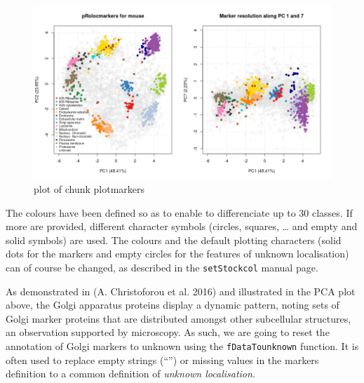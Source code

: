 \begin{Shaded}
\begin{Highlighting}[]
\NormalTok{(} \NormalTok{(}\NormalTok{, }\NormalTok{))}
 \NormalTok{)}
 \NormalTok{)}
 \NormalTok{(}\NormalTok{, }\NormalTok{), } \NormalTok{)}
\end{Highlighting}
\end{Shaded}

\begin{figure}[htbp]
\centering
\includegraphics{figure/plotmarkers-1.png}
\caption{plot of chunk plotmarkers}
\end{figure}

The colours have been defined so as to enable to differenciate up to 30
classes. If more are provided, different character symbols (circles,
squares, \ldots{} and empty and solid symbols) are used. The colours and
the default plotting characters (solid dots for the markers and empty
circles for the features of unknown localisation) can of course be
changed, as described in the \texttt{setStockcol} manual page.

As demonstrated in (A. Christoforou et al. 2016) and illustrated in the
PCA plot above, the Golgi apparatus proteins display a dynamic pattern,
noting sets of Golgi marker proteins that are distributed amongst other
subcellular structures, an observation supported by microscopy. As such,
we are going to reset the annotation of Golgi markers to unknown using
the \texttt{fDataTounknown} function. It is often used to replace empty
strings (``'') or missing values in the markers definition to a common
definition of \emph{unknown localisation}.

